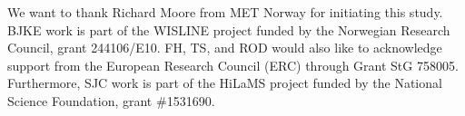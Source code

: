 \documentclass{ametsocV5}
\begin{document}
%
\acknowledgments
We want to thank Richard Moore from MET Norway for initiating this study. BJKE work is part of the WISLINE project funded by the Norwegian Research Council, grant 244106/E10. FH, TS, and ROD would also like to acknowledge support from the European Research Council (ERC) through Grant StG 758005. Furthermore, SJC work is part of the HiLaMS project funded by the National Science Foundation, grant \#1531690. 





%






%
%
%


\end{document}

